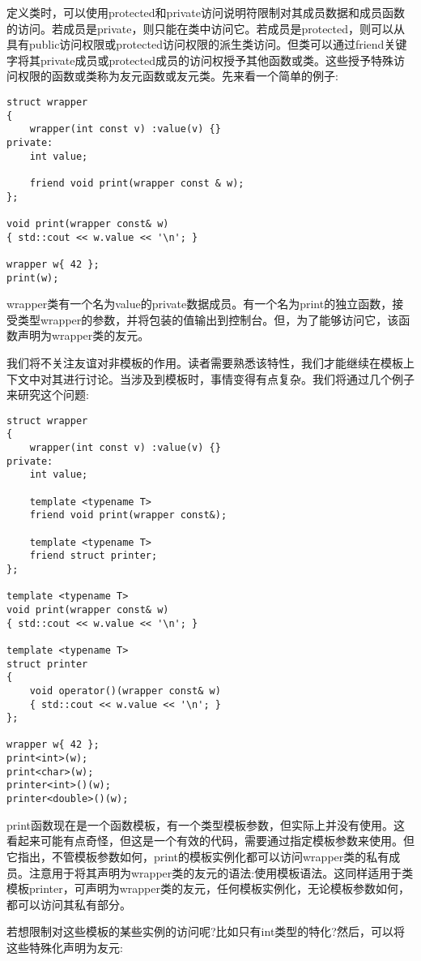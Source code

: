 定义类时，可以使用protected和private访问说明符限制对其成员数据和成员函数的访问。若成员是private，则只能在类中访问它。若成员是protected，则可以从具有public访问权限或protected访问权限的派生类访问。但类可以通过friend关键字将其private成员或protected成员的访问权授予其他函数或类。这些授予特殊访问权限的函数或类称为友元函数或友元类。先来看一个简单的例子:

\begin{lstlisting}[style=styleCXX]
struct wrapper
{
	wrapper(int const v) :value(v) {}
private:
	int value;
	
	friend void print(wrapper const & w);
};

void print(wrapper const& w)
{ std::cout << w.value << '\n'; }

wrapper w{ 42 };
print(w);
\end{lstlisting}

wrapper类有一个名为value的private数据成员。有一个名为print的独立函数，接受类型wrapper的参数，并将包装的值输出到控制台。但，为了能够访问它，该函数声明为wrapper类的友元。

我们将不关注友谊对非模板的作用。读者需要熟悉该特性，我们才能继续在模板上下文中对其进行讨论。当涉及到模板时，事情变得有点复杂。我们将通过几个例子来研究这个问题:

\begin{lstlisting}[style=styleCXX]
struct wrapper
{
	wrapper(int const v) :value(v) {}
private:
	int value;
	
	template <typename T>
	friend void print(wrapper const&);
	
	template <typename T>
	friend struct printer;
};

template <typename T>
void print(wrapper const& w)
{ std::cout << w.value << '\n'; }

template <typename T>
struct printer
{
	void operator()(wrapper const& w)
	{ std::cout << w.value << '\n'; }
};

wrapper w{ 42 };
print<int>(w);
print<char>(w);
printer<int>()(w);
printer<double>()(w);
\end{lstlisting}

print函数现在是一个函数模板，有一个类型模板参数，但实际上并没有使用。这看起来可能有点奇怪，但这是一个有效的代码，需要通过指定模板参数来使用。但它指出，不管模板参数如何，print的模板实例化都可以访问wrapper类的私有成员。注意用于将其声明为wrapper类的友元的语法:使用模板语法。这同样适用于类模板printer，可声明为wrapper类的友元，任何模板实例化，无论模板参数如何，都可以访问其私有部分。

若想限制对这些模板的某些实例的访问呢?比如只有int类型的特化?然后，可以将这些特殊化声明为友元:

